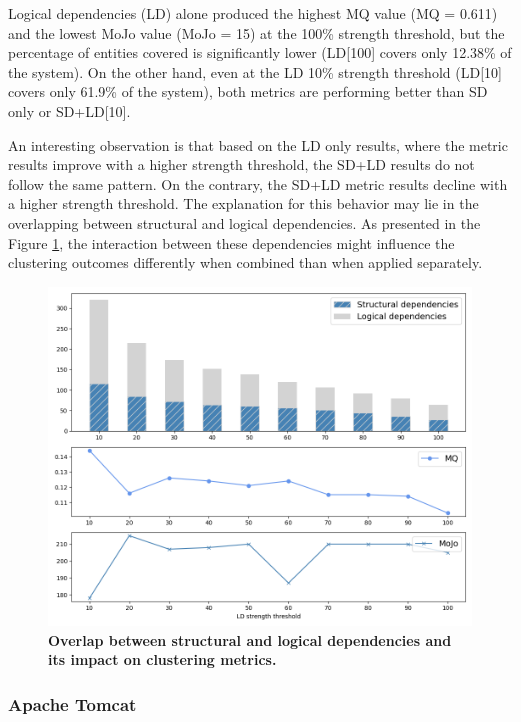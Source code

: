 \documentclass{ieeeaccess}
\begin{document}
Logical dependencies (LD) alone produced the highest MQ value (MQ = 0.611) and the lowest MoJo value (MoJo = 15) at the 100\% strength threshold, but the percentage of entities covered is significantly lower (LD[100] covers only 12.38\% of the system). On the other hand, even at the LD 10\% strength threshold (LD[10] covers only 61.9\% of the system), both metrics are performing better than SD only or SD+LD[10].

An interesting observation is that based on the LD only results, where the metric results improve with a higher strength threshold, the SD+LD results do not follow the same pattern. On the contrary, the SD+LD metric results decline with a higher strength threshold. The explanation for this behavior may lie in the overlapping between structural and logical dependencies. As presented in the Figure \ref{fig:ant_correlation}, the interaction between these dependencies might influence the clustering outcomes differently when combined than when applied separately.

\begin{figure}[t!]
  \centering
  \includegraphics[width=\columnwidth]{ant_correlation.png}
  \caption{\textbf{Overlap between structural and logical dependencies and its impact on clustering metrics.}}
  \label{fig:ant_correlation}
\end{figure}

\subsubsection{Apache Tomcat}
\end{document}

